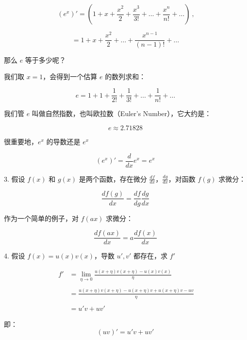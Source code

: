 \begin{equation}
(e^x)' = \left(1 + x + \frac{x^2}{2} + \frac{x^3}{3!} + \ldots + \frac{x^n}{n!} + \ldots\right)~, 
\end{equation}

\begin{equation}
= 1 + x + \frac{x^2}{2} + \ldots + \frac{x^{n-1}}{(n-1)!} + \ldots~
\end{equation}

那么 $e$ 等于多少呢？

我们取 $x = 1$，会得到一个估算 $e$ 的数列求和：

\begin{equation}
e = 1 + 1 + \frac{1}{2!} + \frac{1}{3!} + \ldots + \frac{1}{n!} + \ldots~
\end{equation}

我们管 $e$ 叫做自然指数，也叫欧拉数（Euler's Number），它大约是：

\begin{equation}
e \approx 2.71828~
\end{equation}

很重要地，$e^x$ 的导数还是 $e^x$

\begin{equation}
(e^x)' = \frac{d}{dx} e^x = e^x~
\end{equation}

3. 假设 $f(x)$ 和 $g(x)$ 是两个函数，存在微分 $\frac{df}{dx}$，$\frac{dg}{dx}$，对函数 $f(g)$ 求微分：

\begin{equation}
\frac{df(g)}{dx} = \frac{df}{dg} \frac{dg}{dx}~
\end{equation}

作为一个简单的例子，对 $f(ax)$ 求微分：

\begin{equation}
\frac{df(ax)}{dx} = a \frac{df(x)}{dx}~
\end{equation}

4. 假设 $f(x) = u(x)v(x)$，导数 $u', v'$ 都存在，求 $f'$

\begin{align*}
f' &= \lim_{\eta \to 0} \frac{u(x + \eta)v(x + \eta) - u(x)v(x)}{\eta} \\\\
&=  \frac{u(x + \eta)v(x + \eta) - u(x + \eta)v + u(x + \eta)v - uv}{\eta} \\\\
&= u'v + uv'~
\end{align*}

即：
\begin{equation}
(uv)' = u'v + uv'~
\end{equation}

